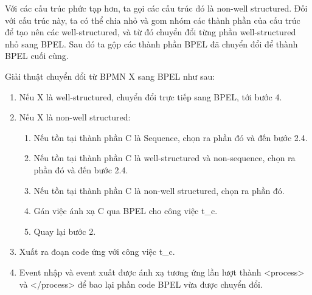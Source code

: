 \par Với các cấu trúc phức tạp hơn, ta gọi các cấu trúc đó là non-well structured. Đối với cấu trúc này, ta có thể chia nhỏ và gom nhóm các thành phần của cấu trúc để tạo nên các well-structured, và từ đó chuyển đổi từng phần well-structured nhỏ sang BPEL. 
Sau đó ta gộp các thành phần BPEL đã chuyển đổi để thành BPEL cuối cùng.

\par Giải thuật chuyển đổi từ BPMN X sang BPEL như sau:
\begin{enumerate}
	\item Nếu X là well-structured, chuyển đổi trực tiếp sang BPEL, tới bước 4.
	\item Nếu X là non-well structured:
	\begin{enumerate}
		\item Nếu tồn tại thành phần C là Sequence, chọn ra phần đó và đến bước 2.4.
		\item Nếu tồn tại thành phần C là well-structured và non-sequence, chọn ra phần đó và đến bước 2.4.
		\item Nếu tồn tại thành phần C là non-well structured, chọn ra phần đó.
		\item Gán việc ánh xạ C qua BPEL cho công việc t\_{c}.
		\item Quay lại bước 2.
	\end{enumerate}
	\item Xuất ra đoạn code ứng với công việc t\_{c}.
	\item Event nhập và event xuất được ánh xạ tương ứng lần lượt thành <process> và </process> để bao lại phần code BPEL vừa được chuyển đổi.
\end{enumerate}
